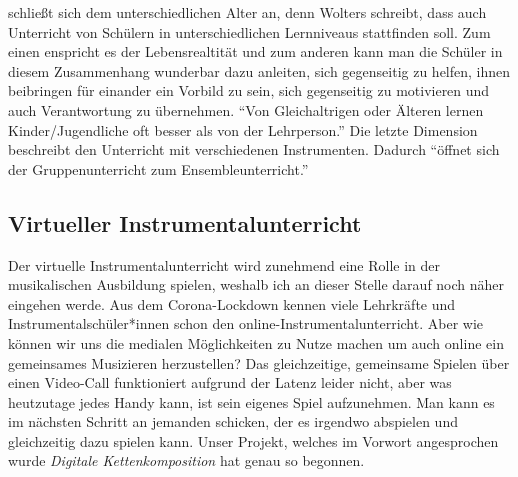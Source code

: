 schließt sich dem unterschiedlichen Alter an, denn Wolters schreibt, dass auch
Unterricht von Schülern in unterschiedlichen Lernniveaus stattfinden soll. Zum
einen enspricht es der Lebensrealtität und zum anderen kann man die Schüler in
diesem Zusammenhang wunderbar dazu anleiten, sich gegenseitig zu helfen, ihnen
beibringen für einander ein Vorbild zu sein, sich gegenseitig zu motivieren und
auch Verantwortung zu übernehmen. \enquote{Von Gleichaltrigen oder Älteren
lernen Kinder/Jugendliche oft besser als von der Lehrperson.}
\autocite[87]{ernst:die_zukunftsfaehige_musikschule} Die letzte Dimension
beschreibt den Unterricht mit verschiedenen Instrumenten. Dadurch
\enquote{öffnet sich der Gruppenunterricht zum Ensembleunterricht.}
\autocite[87]{ernst:die_zukunftsfaehige_musikschule}



\subsection{Virtueller Instrumentalunterricht} 
Der virtuelle Instrumentalunterricht wird zunehmend eine Rolle in der
musikalischen Ausbildung spielen, weshalb ich an dieser Stelle darauf noch näher
eingehen werde. Aus dem Corona-Lockdown kennen viele Lehrkräfte und
Instrumentalschüler*innen schon den online-Instrumentalunterricht. Aber wie
können wir uns die medialen Möglichkeiten zu Nutze machen um auch online ein
gemeinsames Musizieren herzustellen? Das gleichzeitige, gemeinsame Spielen über
einen Video-Call funktioniert aufgrund der Latenz leider nicht, aber was
heutzutage jedes Handy kann, ist sein eigenes Spiel aufzunehmen. Man kann es im
nächsten Schritt an jemanden schicken, der es irgendwo abspielen und
gleichzeitig dazu spielen kann. Unser Projekt, welches im Vorwort angesprochen
wurde \emph{Digitale Kettenkomposition} hat genau so begonnen. 

